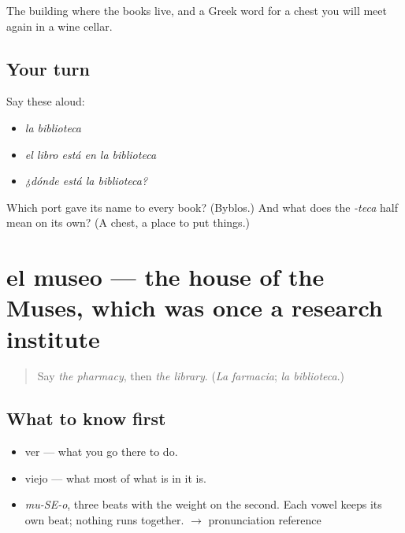 \begin{grammarlens}[title={What you've built}]
The building where the books live, and a Greek word for a chest you will meet again in a wine cellar.
\end{grammarlens}

\subsection*{Your turn}
Say these aloud:

\begin{itemize}
\raggedright
  \item \emph{la biblioteca}
  \item \emph{el libro está en la biblioteca}
  \item \emph{¿dónde está la biblioteca?}
\end{itemize}

\begin{tcolorbox}[breakable,colback=teal!4,colframe=teal!35!black,title={Before you move on}]
Which port gave its name to every book? (Byblos.) And what does the \emph{-teca} half mean on its own? (A chest, a place to put things.)
\end{tcolorbox}
\section[el museo]{el museo — the house of the Muses, which was once a research institute}

\label{lesson:ES-C353-museo}



\begin{quote}
Say \emph{the pharmacy}, then \emph{the library}. (\emph{La farmacia}; \emph{la biblioteca}.)
\end{quote}

\subsection*{What to know first}
\begin{itemize}
\raggedright
  \item ver — what you go there to do.
  \item viejo — what most of what is in it is.
\end{itemize}

\begin{sounds}
\begin{itemize}
\raggedright
  \item \emph{mu-SE-o}, three beats with the weight on the second. Each vowel keeps its own beat; nothing runs together. $\to$ pronunciation reference
\end{itemize}
\end{sounds}

